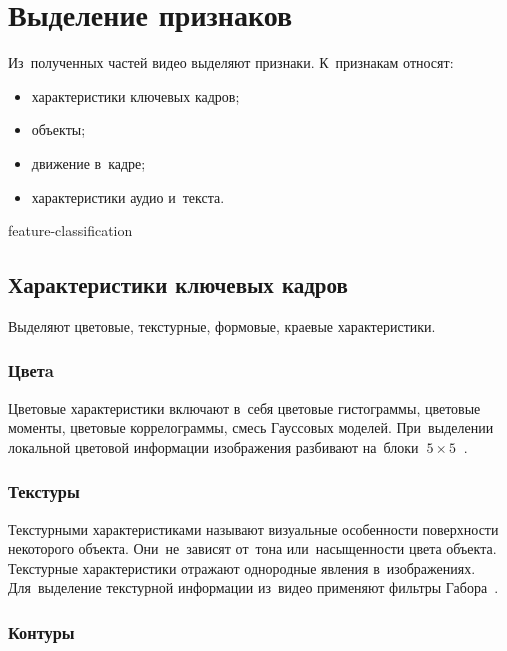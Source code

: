
\section{Выделение признаков}

Из~полученных частей видео выделяют признаки.
К~признакам относят:
\begin{itemize}
    \item характеристики ключевых кадров;
    \item объекты;
    \item движение в~кадре;
    \item характеристики аудио и~текста.
\end{itemize}


\begin{figuredt}
    {feature-classification}
\end{figuredt}


\subsection{Характеристики ключевых кадров}

Выделяют цветовые, текстурные, формовые, краевые характеристики.

\subsubsection{Цветa}

Цветовые характеристики включают в~себя цветовые гистограммы,
цветовые моменты,
цветовые коррелограммы,
смесь Гауссовых моделей.
При~выделении локальной цветовой информации изображения разбивают
на~блоки $~5 \times 5~$ \cite{Yan:2007}.


\subsubsection{Текстуры}

Текстурными характеристиками называют визуальные особенности поверхности
некоторого объекта. Они~не~зависят от~тона или~насыщенности цвета объекта.
Текстурные характеристики отражают однородные явления в~изображениях.
Для~выделение текстурной информации
из~видео применяют фильтры Габора\ \cite{Adcock:2004}.

\subsubsection{Контуры}

